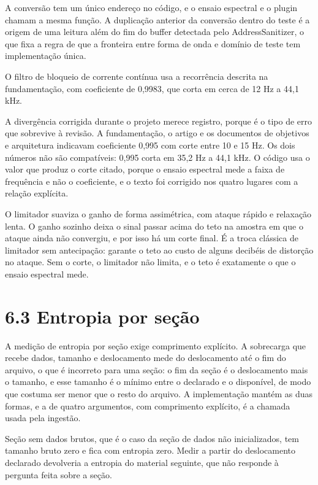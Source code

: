 \documentclass[12pt,a4paper]{article}
\begin{document}
A conversão tem um único endereço no código, e o ensaio espectral e o plugin chamam a mesma função. A duplicação anterior da conversão dentro do teste é a origem de uma leitura além do fim do buffer detectada pelo AddressSanitizer, o que fixa a regra de que a fronteira entre forma de onda e domínio de teste tem implementação única.


O filtro de bloqueio de corrente contínua usa a recorrência descrita na fundamentação, com coeficiente de 0,9983, que corta em cerca de 12 Hz a 44,1 kHz.


A divergência corrigida durante o projeto merece registro, porque é o tipo de erro que sobrevive à revisão. A fundamentação, o artigo e os documentos de objetivos e arquitetura indicavam coeficiente 0,995 com corte entre 10 e 15 Hz. Os dois números não são compatíveis: 0,995 corta em 35,2 Hz a 44,1 kHz. O código usa o valor que produz o corte citado, porque o ensaio espectral mede a faixa de frequência e não o coeficiente, e o texto foi corrigido nos quatro lugares com a relação explícita.


O limitador suaviza o ganho de forma assimétrica, com ataque rápido e relaxação lenta. O ganho sozinho deixa o sinal passar acima do teto na amostra em que o ataque ainda não convergiu, e por isso há um corte final. É a troca clássica de limitador sem antecipação: garante o teto ao custo de alguns decibéis de distorção no ataque. Sem o corte, o limitador não limita, e o teto é exatamente o que o ensaio espectral mede.


\section*{6.3 Entropia por seção}

A medição de entropia por seção exige comprimento explícito. A sobrecarga que recebe dados, tamanho e deslocamento mede do deslocamento até o fim do arquivo, o que é incorreto para uma seção: o fim da seção é o deslocamento mais o tamanho, e esse tamanho é o mínimo entre o declarado e o disponível, de modo que costuma ser menor que o resto do arquivo. A implementação mantém as duas formas, e a de quatro argumentos, com comprimento explícito, é a chamada usada pela ingestão.


Seção sem dados brutos, que é o caso da seção de dados não inicializados, tem tamanho bruto zero e fica com entropia zero. Medir a partir do deslocamento declarado devolveria a entropia do material seguinte, que não responde à pergunta feita sobre a seção.
\end{document}
